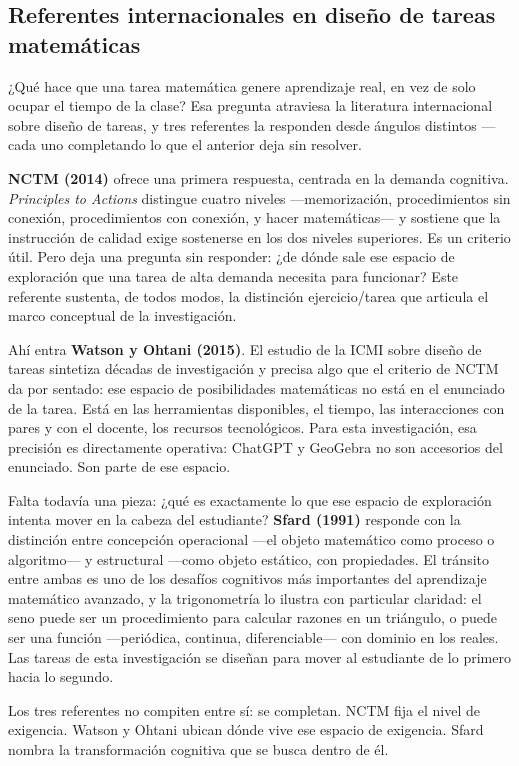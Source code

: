 \subsection{Referentes internacionales en diseño de tareas matemáticas}

¿Qué hace que una tarea matemática genere aprendizaje real, en vez de solo ocupar el tiempo de la clase? Esa pregunta atraviesa la literatura internacional sobre diseño de tareas, y tres referentes la responden desde ángulos distintos —cada uno completando lo que el anterior deja sin resolver.

\textbf{NCTM (2014)} ofrece una primera respuesta, centrada en la demanda cognitiva. \emph{Principles to Actions} \parencite{nctmPrinciplesActions2014} distingue cuatro niveles —memorización, procedimientos sin conexión, procedimientos con conexión, y hacer matemáticas— y sostiene que la instrucción de calidad exige sostenerse en los dos niveles superiores. Es un criterio útil. Pero deja una pregunta sin responder: ¿de dónde sale ese espacio de exploración que una tarea de alta demanda necesita para funcionar? Este referente sustenta, de todos modos, la distinción ejercicio/tarea que articula el marco conceptual de la investigación.

Ahí entra \textbf{Watson y Ohtani (2015)}. El estudio de la ICMI sobre diseño de tareas \parencite{watsonTaskDesignMathematics2015} sintetiza décadas de investigación y precisa algo que el criterio de NCTM da por sentado: ese espacio de posibilidades matemáticas no está en el enunciado de la tarea. Está en las herramientas disponibles, el tiempo, las interacciones con pares y con el docente, los recursos tecnológicos. Para esta investigación, esa precisión es directamente operativa: ChatGPT y GeoGebra no son accesorios del enunciado. Son parte de ese espacio.

Falta todavía una pieza: ¿qué es exactamente lo que ese espacio de exploración intenta mover en la cabeza del estudiante? \textbf{Sfard (1991)} \parencite{sfardDualNatureMathematical1991} responde con la distinción entre concepción operacional —el objeto matemático como proceso o algoritmo— y estructural —como objeto estático, con propiedades. El tránsito entre ambas es uno de los desafíos cognitivos más importantes del aprendizaje matemático avanzado, y la trigonometría lo ilustra con particular claridad: el seno puede ser un procedimiento para calcular razones en un triángulo, o puede ser una función —periódica, continua, diferenciable— con dominio en los reales. Las tareas de esta investigación se diseñan para mover al estudiante de lo primero hacia lo segundo.

Los tres referentes no compiten entre sí: se completan. NCTM fija el nivel de exigencia. Watson y Ohtani ubican dónde vive ese espacio de exigencia. Sfard nombra la transformación cognitiva que se busca dentro de él.
